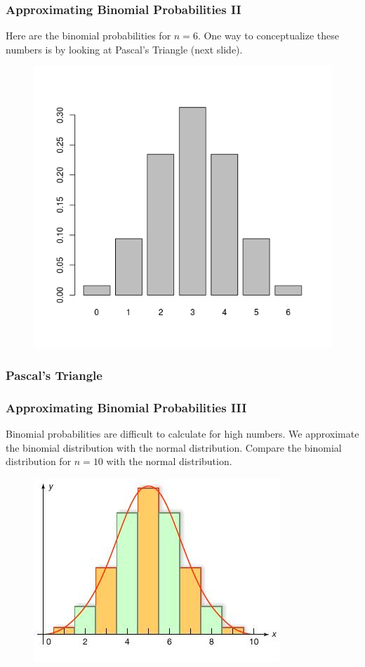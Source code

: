 \documentclass[xcolor=dvipsnames]{beamer}
\begin{document}
\begin{frame}
  \frametitle{Approximating Binomial Probabilities II}
Here are the binomial probabilities for $n=6$. One way to
conceptualize these numbers is by looking at Pascal's Triangle (next
slide). 
  \begin{figure}[h]
    \includegraphics[scale=.5]{./diagrams/binomial1.png}
  \end{figure}
\end{frame}

\begin{frame}
  \frametitle{Pascal's Triangle}
\end{frame}

\begin{frame}
  \frametitle{Approximating Binomial Probabilities III}
Binomial probabilities are difficult to calculate for high numbers. We
approximate the binomial distribution with the \alert{normal distribution}.
Compare the binomial distribution for $n=10$ with the normal
distribution.
  \begin{figure}[h]
    \includegraphics[scale=.5]{./diagrams/binnorm1_ed.jpg}
  \end{figure}
\end{frame}
\end{document}

